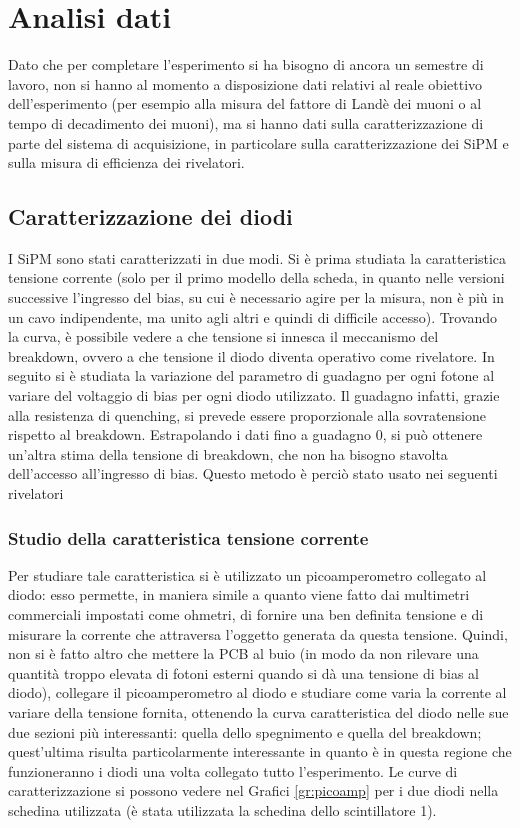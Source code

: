 \section{Analisi dati}
Dato che per completare l'esperimento si ha bisogno di ancora un semestre di lavoro, non si hanno al momento a disposizione dati relativi al reale obiettivo dell'esperimento
(per esempio alla misura del fattore di Landè dei muoni o al tempo di decadimento dei muoni), ma si hanno dati sulla caratterizzazione di parte del sistema di acquisizione,
in particolare sulla caratterizzazione dei SiPM e sulla misura di efficienza dei rivelatori.

\subsection{Caratterizzazione dei diodi}
I SiPM sono stati caratterizzati in due modi. Si è prima studiata la caratteristica tensione corrente (solo per il primo modello della scheda, in quanto nelle versioni successive l'ingresso del bias, su cui \`e necessario agire per la misura, non \`e pi\`u in un cavo indipendente, ma unito agli altri e quindi di difficile accesso). Trovando la curva, \`e possibile vedere a che tensione si innesca il meccanismo del breakdown, ovvero a che tensione il diodo diventa operativo come rivelatore.
In seguito si è studiata la variazione del parametro di guadagno per ogni fotone al variare del voltaggio di bias per ogni diodo utilizzato. Il guadagno infatti, grazie alla resistenza di quenching, si prevede essere proporzionale alla sovratensione rispetto al breakdown. Estrapolando i dati fino a guadagno 0, si pu\`o ottenere un'altra stima della tensione di breakdown, che non ha bisogno stavolta dell'accesso all'ingresso di bias. Questo metodo \`e perci\`o stato usato nei seguenti rivelatori

\subsubsection{Studio della caratteristica tensione corrente}
Per studiare tale caratteristica si è utilizzato un picoamperometro collegato al diodo: esso permette, in maniera simile a quanto viene fatto dai multimetri commerciali
impostati come ohmetri, di fornire una ben definita tensione e di misurare la corrente che attraversa l'oggetto generata da questa tensione. Quindi,
non si è fatto altro che mettere la PCB al buio (in modo da non rilevare una quantità troppo elevata di fotoni esterni quando si dà una tensione di bias al diodo),
collegare il picoamperometro al diodo e studiare come varia la corrente al variare della tensione fornita, ottenendo la curva caratteristica del diodo nelle sue due
sezioni più interessanti: quella dello spegnimento e quella del breakdown; quest'ultima risulta particolarmente interessante in quanto è in questa regione che funzioneranno
i diodi una volta collegato tutto l'esperimento. Le curve di caratterizzazione si possono vedere nel Grafici \ref{gr:picoamp} per i due  diodi nella schedina utilizzata (è stata utilizzata la schedina dello scintillatore 1).

